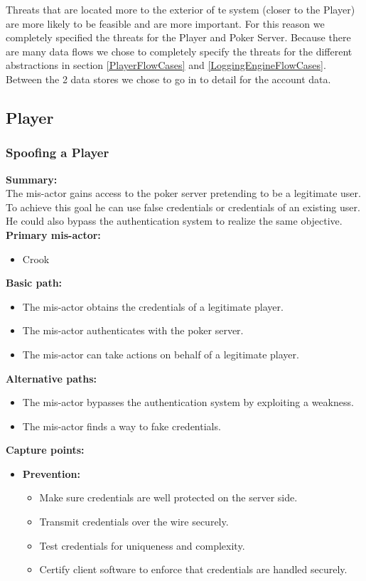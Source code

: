 \documentclass[a4paper,11pt]{report}
\begin{document}
Threats that are located more to the exterior of te system (closer to the Player) are more likely to be feasible and are more important. For this reason we completely specified the threats for the Player and Poker Server. Because there are many data flows we chose to completely specify the threats for the different abstractions in section \ref{PlayerFlowCases} and \ref{LoggingEngineFlowCases}. Between the 2 data stores we chose to go in to detail for the account data.

\subsection{Player}
\label{PlayerCases}
\subsubsection{Spoofing a Player}
\label{PlayerCasesS}
\textbf{Summary:} \\
The mis-actor gains access to the poker server pretending to be a legitimate user. To achieve this goal he can use false credentials or credentials of an existing user. He could also bypass the authentication system to realize the same objective. \\
\textbf{Primary mis-actor:}
\begin{itemize}
\item Crook
\end{itemize}
\textbf{Basic path:}
\begin{itemize}
\item The mis-actor obtains the credentials of a legitimate player.
\item The mis-actor authenticates with the poker server.
\item The mis-actor can take actions on behalf of a legitimate player.
\end{itemize}
\textbf{Alternative paths:}
\begin{itemize}
\item The mis-actor bypasses the authentication system by exploiting a weakness.
\item The mis-actor finds a way to fake credentials.
\end{itemize}
\textbf{Capture points:}
\begin{itemize}
\item \textbf{Prevention:}
\begin{itemize}
\item Make sure credentials are well protected on the server side.
\item Transmit credentials over the wire securely.
\item Test credentials for uniqueness and complexity.
\item Certify client software to enforce that credentials are handled securely.
\end{itemize}
\end{itemize}
\end{document}
